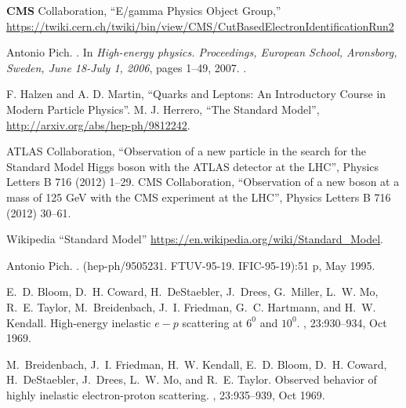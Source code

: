 \begin{thebibliography}{99}
{\bfseries CMS} Collaboration, ``{E/gamma Physics Object Group},''
\newblock \url{https://twiki.cern.ch/twiki/bin/view/CMS/CutBasedElectronIdentificationRun2}


Antonio Pich.
.
\newblock In {\em {High-energy physics. Proceedings, European School,
  Aronsborg, Sweden, June 18-July 1, 2006}}, pages 1--49, 2007.
\newblock [,1(2007)].

 F. Halzen and A. D. Martin, ``Quarks and Leptons: An Introductory Course in Modern
Particle Physics''.
 M. J. Herrero, ``The Standard Model'', {\url {http://arxiv.org/abs/hep-ph/9812242}}.

 ATLAS Collaboration, ``Observation of a new particle in the search for the Standard Model Higgs boson
with the ATLAS detector at the LHC'', Physics Letters B 716 (2012) 1–29.
 CMS Collaboration, ``Observation of a new boson at a mass of 125 GeV with the CMS experiment at
the LHC'', Physics Letters B 716 (2012) 30–61.

 Wikipedia ``Standard Model'' {\url{https://en.wikipedia.org/wiki/Standard_Model}}.

Antonio Pich.
.
\newblock (hep-ph/9505231. FTUV-95-19. IFIC-95-19):51 p, May 1995.




E.~D. Bloom, D.~H. Coward, H.~DeStaebler, J.~Drees, G.~Miller, L.~W. Mo, R.~E.
  Taylor, M.~Breidenbach, J.~I. Friedman, G.~C. Hartmann, and H.~W. Kendall.
\newblock High-energy inelastic $e{-}p$ scattering at $6^{0}$ and $10^{0} $.
, 23:930--934, Oct 1969.



M.~Breidenbach, J.~I. Friedman, H.~W. Kendall, E.~D. Bloom, D.~H. Coward,
  H.~DeStaebler, J.~Drees, L.~W. Mo, and R.~E. Taylor.
\newblock Observed behavior of highly inelastic electron-proton scattering.
, 23:935--939, Oct 1969.




\end{thebibliography}
